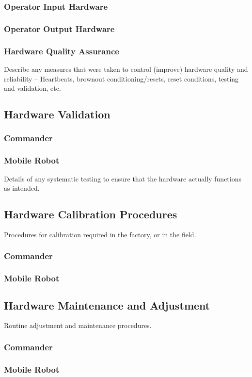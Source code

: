 \documentclass[MTRX3700report.tex]{subfiles}
\begin{document}
    \subsubsection{Operator Input Hardware}
    \subsubsection{Operator Output Hardware}
    \subsubsection{Hardware Quality Assurance}
    Describe any measures that were taken to control (improve) hardware quality and reliability – Heartbeats, brownout conditioning/resets, reset conditions, testing and validation, etc.


  \subsection{Hardware Validation}
    \subsubsection{Commander}
    \subsubsection{Mobile Robot}
  Details of any systematic testing to ensure that the hardware actually functions as intended.

  \subsection{Hardware Calibration Procedures}
  Procedures for calibration required in the factory, or in the field.
    \subsubsection{Commander}
    \subsubsection{Mobile Robot}

  \subsection{Hardware Maintenance and Adjustment}
  Routine adjustment and maintenance procedures.
    \subsubsection{Commander}
    \subsubsection{Mobile Robot}
\end{document}
